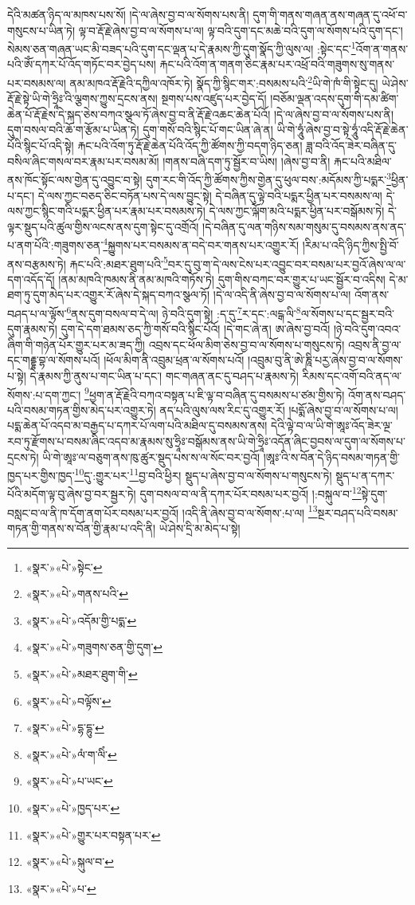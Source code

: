 དེའི་མཚན་ཉིད་ལ་མཁས་པས་སོ། །དེ་ལ་ཞེས་བྱ་བ་ལ་སོགས་པས་ནི། དུག་གི་གནས་གཞན་ནས་གཞན་དུ་འཕོ་བ་གསུངས་པ་ཡིན་ཏེ། ལྟ་བ་རྡོ་རྗེ་ཞེས་བྱ་བ་ལ་སོགས་པ་ལ། ལྟ་བའི་དུག་དང་མཆེ་བའི་དུག་ལ་སོགས་པའི་དུག་དང་། སེམས་ཅན་གཞན་ཡང་མི་བཟད་པའི་དུག་དང་ལྡན་པ་དེ་རྣམས་ཀྱི་དུག་སྣོད་ཀྱི་ལུས་ལ། :སྟེང་དང་\footnote{«སྣར་»«པེ་»སྟེང་}འོག་ན་གནས་པའི་ཨོཾ་དཀར་པོ་འོད་གཏོང་བར་བྱེད་པས། རྐང་པའི་འོག་ན་གནག་ཅིང་རྣམ་པར་འཕྲོ་བའི་གཟུགས་སུ་གནས་པར་བསམས་ལ། ནམ་མཁའ་རྡོ་རྗེའི་དཀྱིལ་འཁོར་ཏེ། སྣོད་ཀྱི་སྙིང་གར་:བསམས་པའི་\footnote{«སྣར་»«པེ་»གནས་པའི་}ཡི་གེ་ཁཾ་གི་སྟེང་དུ། ཡེ་ཤེས་རྡོ་རྗེ་སྟེ་ཡི་གེ་ཧྲཱིཿ་འི་ལྕགས་ཀྱུས་དྲངས་ནས། སྔགས་པས་འཛུད་པར་བྱེད་དོ། །བཅོམ་ལྡན་འདས་དུག་གི་དམ་ཚིག་ཆེན་པོ་རྡོ་རྗེས་དེ་སྐད་ཅེས་བཀའ་སྩལ་ཏོ་ཞེས་བྱ་བ་ནི་རྡོ་རྗེ་འཆང་ཆེན་པོའོ། །དེ་ལ་ཞེས་བྱ་བ་ལ་སོགས་པས་ནི། དུག་བསལ་བའི་ཆོ་ག་རྩོམ་པ་ཡིན་ཏེ། དུག་གསོ་བའི་སྙིང་པོ་གང་ཡིན་ཞེ་ན། ཡི་གེ་ཧཱུཾ་ཞེས་བྱ་བ་སྟེ་ཧཱུཾ་འདི་རྡོ་རྗེ་ཆེན་པོའི་སྙིང་པོ་འདི་སྟེ། རྐང་པའི་འོག་ཏུ་རྡོ་རྗེ་ཆེན་པོའི་འོད་ཀྱི་ཚོགས་ཀྱི་བདག་ཉིད་ཅན། ཟླ་བའི་འོད་ཟེར་བཞིན་དུ་བསིལ་ཞིང་གསལ་བར་རྣམ་པར་བསམ་མོ། །གནས་བཞི་དག་ཏུ་སྦྱོར་བ་ཡིས། །ཞེས་བྱ་བ་ནི། རྐང་པའི་མཐིལ་ནས་ཁོང་སྟོང་ལས་གྱེན་དུ་འབྱུང་བ་སྟེ། དུག་རང་གི་འོད་ཀྱི་ཚོགས་ཀྱིས་གྱེན་དུ་ཕུལ་བས་:མདོམས་ཀྱི་པདྨར་\footnote{«སྣར་»«པེ་»འདོམ་གྱི་པདྨ་}ཕྱིན་པ་དང་། དེ་ལས་ཀྱང་བཅད་ཅིང་བཏོན་པས་དེ་ལས་བྱུང་སྟེ། དེ་བཞིན་དུ་ལྟེ་བའི་པདྨར་ཕྱིན་པར་བསམས་ལ། དེ་ལས་ཀྱང་སྙིང་གའི་པདྨར་ཕྱིན་པར་རྣམ་པར་བསམས་ཏེ། དེ་ལས་ཀྱང་ལྐོག་མའི་པདྨར་ཕྱིན་པར་བསྒོམས་ཏེ། དེ་ལྟར་སྡུད་པའི་ཚུལ་གྱིས་ལངས་ནས་དུག་སྟེང་དུ་འགྲོའོ། །དེ་བཞིན་དུ་ལན་གཉིས་སམ་གསུམ་དུ་བསམས་ནས་ནད་པ་ནག་པོའི་:གཟུགས་ཅན་\footnote{«སྣར་»«པེ་»གཟུགས་ཅན་གྱི་དུག་}སྐྱུགས་པར་བསམས་ན་བདེ་བར་གནས་པར་འགྱུར་རོ། །རིམ་པ་འདི་ཉིད་ཀྱིས་སྤྱི་བོ་ནས་བརྩམས་ཏེ། རྐང་པའི་:མཐར་ཐུག་པའི་\footnote{«སྣར་»«པེ་»མཐར་ཐུག་གི་}བར་དུ་བུ་ག་དེ་ལས་ངེས་པར་འབྱུང་བར་བསམ་པར་བྱའོ་ཞེས་ལ་ལ་དག་འདོད་དོ། །ནམ་མཁའི་ཁམས་ནི་ནམ་མཁའི་གཏོས་ཏེ། དུག་གིས་བཀང་བར་གྱུར་པ་ཡང་སྦྱོར་བ་འདིས། དེ་མ་ཐག་ཏུ་དུག་མེད་པར་འགྱུར་རོ་ཞེས་དེ་སྐད་བཀའ་སྩལ་ཏོ། །དེ་ལ་འདི་ནི་ཞེས་བྱ་བ་ལ་སོགས་པ་ལ། འོག་ནས་བཤད་པ་ལ་ལྟོས་\footnote{«སྣར་»«པེ་»བལྟོས་}ནས་དུག་བསལ་བ་དེ་ལ། ཉེ་བའི་དུག་སྟེ། :ད་དུ་\footnote{«སྣར་»«པེ་»དྷ་དྷུ་}ར་དང་:ལངྒ་ལི་\footnote{«སྣར་»«པེ་»ལཾ་ག་ལིཾ་}ལ་སོགས་པ་དང་སྦྱར་བའི་དུག་རྣམས་ཏེ། དུག་དེ་དག་ཐམས་ཅད་ཀྱི་གསོ་བའི་སྙིང་པོའོ། །དེ་གང་ཞེ་ན། ཨ་ཞེས་བྱ་བའོ། །ཉེ་བའི་དུག་འབའ་ཞིག་གི་གཉེན་པོར་གྱུར་པར་མ་ཟད་ཀྱི། འབྲས་དང་ཕོལ་མིག་ཅེས་བྱ་བ་ལ་སོགས་པ་གསུངས་ཏེ། འབྲས་ནི་བྱ་ལ་དང་གརྡྷ་བྷ་ལ་སོགས་པའོ། །ཕོལ་མིག་ནི་འབྲུམ་ཕྲན་ལ་སོགས་པའོ། །འབྲུམ་བུ་ནི་ཨེ་ཎཱི་པརྱ་ཞེས་བྱ་བ་ལ་སོགས་པ་སྟེ། དེ་རྣམས་ཀྱི་ནུས་པ་གང་ཡིན་པ་དང་། གང་གཞན་ནང་དུ་བཤད་པ་རྣམས་ཏེ། རིམས་དང་འགོ་བའི་ནད་ལ་སོགས་:པ་དག་ཀྱང་། \footnote{«སྣར་»«པེ་»པ་ཡང་}ཕྱག་ན་རྡོ་རྗེའི་བཀའ་བསྟན་པ་ཇི་ལྟ་བ་བཞིན་དུ་བསམས་པ་ཙམ་གྱིས་ཏེ། འོག་ནས་བཤད་པའི་བསམ་གཏན་གྱིས་མེད་པར་འགྱུར་ཏེ། ནད་པའི་ལུས་ལས་རིང་དུ་འགྱུར་རོ། །པདྨོ་ཞེས་བྱ་བ་ལ་སོགས་པ་ལ། པདྨ་ཆེན་པོ་འདབ་མ་བརྒྱད་པ་དཀར་པོ་ལག་པའི་མཐིལ་དུ་བསམས་ནས། དེའི་ལྟེ་བ་ལ་ཡི་གེ་ཨཱཿ་འོད་ཟེར་ལྔ་རབ་ཏུ་རྫོགས་པ་བསམ་ཞིང་འདབ་མ་རྣམས་སུ་ཧྲཱིཿ་བསྒོམས་ནས་ཡི་གེ་ཧྲཱིཿ་འདོན་ཞིང་བྱབས་ལ་དུག་ལ་སོགས་པ་དྲངས་ཏེ། ཡི་གེ་ཨཱཿ་ལ་བཅུག་ནས་ཁུ་ཚུར་སྡུད་པས་ས་ལ་སོང་བར་བྱའོ། །ཨཱཿ་འི་ས་བོན་དེ་ཉིད་བསམ་གཏན་གྱི་ཁྱད་པར་གྱིས་ཁྱད་\footnote{«སྣར་»«པེ་»ཁྱད་པར་}དུ་:གྱུར་པར་\footnote{«སྣར་»«པེ་»གྱུར་པར་བསྟན་པར་}བྱ་བའི་ཕྱིར། སྡུད་པ་ཞེས་བྱ་བ་ལ་སོགས་པ་གསུངས་ཏེ། སྡུད་པ་ན་དཀར་པོའི་མདོག་ལྟ་བུ་ཞེས་བྱ་བར་སྦྱར་ཏེ། དུག་བསལ་བ་ལ་ནི་དཀར་པོར་བསམ་པར་བྱའོ། །:བསྐུལ་བ་\footnote{«སྣར་»«པེ་»སྐུལ་བ་}སྟེ་དུག་བསླང་བ་ལ་ནི་ཁ་དོག་ནག་པོར་བསམ་པར་བྱའོ། །འདི་ནི་ཞེས་བྱ་བ་ལ་སོགས་:པ་ལ། \footnote{«སྣར་»«པེ་»པ་}སྔར་བཤད་པའི་བསམ་གཏན་གྱི་གནས་ས་བོན་གྱི་རྣམ་པ་འདི་ནི། ཡེ་ཤེས་དྲི་མ་མེད་པ་སྟེ། 